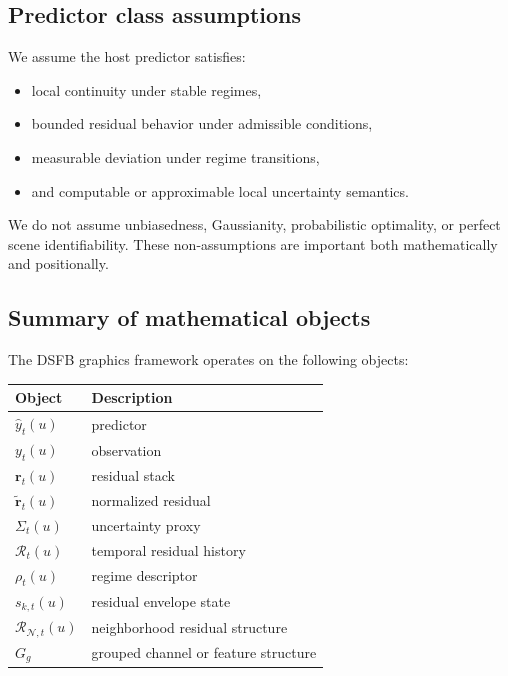\documentclass[11pt]{article}
\theoremstyle{definition}
\theoremstyle{plain}
\begin{document}

\subsection{Predictor class assumptions}

We assume the host predictor satisfies:
\begin{itemize}[leftmargin=1.5em]
    \item local continuity under stable regimes,
    \item bounded residual behavior under admissible conditions,
    \item measurable deviation under regime transitions,
    \item and computable or approximable local uncertainty semantics.
\end{itemize}

We do not assume unbiasedness, Gaussianity, probabilistic optimality, or perfect scene identifiability. These non-assumptions are important both mathematically and positionally.


\subsection{Summary of mathematical objects}

The DSFB graphics framework operates on the following objects:
\begin{center}
\begin{tabular}{ll}
\toprule
Object & Description \\
\midrule
$\hat y_t(u)$ & predictor \\
$y_t(u)$ & observation \\
$\mathbf r_t(u)$ & residual stack \\
$\tilde{\mathbf r}_t(u)$ & normalized residual \\
$\Sigma_t(u)$ & uncertainty proxy \\
$\mathcal R_t(u)$ & temporal residual history \\
$\rho_t(u)$ & regime descriptor \\
$s_{k,t}(u)$ & residual envelope state \\
$\mathcal R_{\mathcal N,t}(u)$ & neighborhood residual structure \\
$G_g$ & grouped channel or feature structure \\
\bottomrule
\end{tabular}
\end{center}
\end{document}
